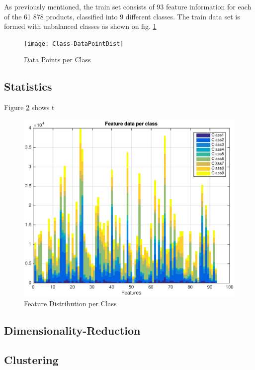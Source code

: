 \documentclass[a4paper, 12pt]{article}
\begin{document}
As previously mentioned, the train set consists of 93 feature information for each of the 61 878 products, classified into 9 different classes. The train data set is formed with unbalanced classes as shown on fig. \ref{fig:Dist}

		\begin{figure}[H]
            \centering 
            \texttt{[image: Class-DataPointDist]}
            \caption{Data Points per Class}
            \label{fig:Dist}
		\end{figure}

\subsection*{Statistics} %

Figure \ref{fig:FDstacked} shows t

		\begin{figure}[H]
            \centering 
            \includegraphics[width=\textwidth]{Feature_Data_stacked}
            \caption{Feature Distribution per Class}
            \label{fig:FDstacked}
		\end{figure}


\subsection*{Dimensionality-Reduction}
\subsection*{Clustering}
\end{document}
